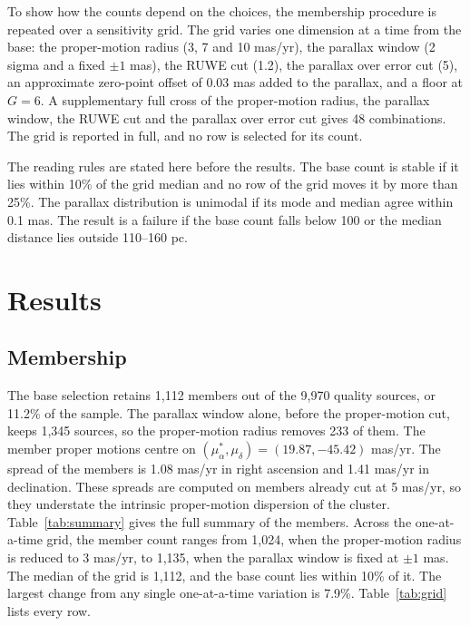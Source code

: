 \documentclass[11pt]{article}
\begin{document}
To show how the counts depend on the choices, the membership procedure is repeated over a sensitivity grid. The grid varies one dimension at a time from the base: the proper-motion radius (3, 7 and 10 mas/yr), the parallax window (2 sigma and a fixed $\pm 1$ mas), the RUWE cut (1.2), the parallax over error cut (5), an approximate zero-point offset of 0.03 mas added to the parallax, and a floor at $G = 6$. A supplementary full cross of the proper-motion radius, the parallax window, the RUWE cut and the parallax over error cut gives 48 combinations.
The grid is reported in full, and no row is selected for its count.

The reading rules are stated here before the results. The base count is stable if it lies within 10\% of the grid median and no row of the grid moves it by more than 25\%. The parallax distribution is unimodal if its mode and median agree within 0.1 mas. The result is a failure if the base count falls below 100 or the median distance lies outside 110--160 pc.

\section{Results}

\subsection{Membership}

The base selection retains 1,112 members out of the 9,970 quality sources, or 11.2\% of the sample.
The parallax window alone, before the proper-motion cut, keeps 1,345 sources, so the proper-motion radius removes 233 of them.
The member proper motions centre on $(\mu_\alpha^*, \mu_\delta) = (19.87, -45.42)$ mas/yr.
The spread of the members is 1.08 mas/yr in right ascension and 1.41 mas/yr in declination. These spreads are computed on members already cut at 5 mas/yr, so they understate the intrinsic proper-motion dispersion of the cluster.
Table~\ref{tab:summary} gives the full summary of the members. Across the one-at-a-time grid, the member count ranges from 1,024, when the proper-motion radius is reduced to 3 mas/yr, to 1,135, when the parallax window is fixed at $\pm 1$ mas.
The median of the grid is 1,112, and the base count lies within 10\% of it. The largest change from any single one-at-a-time variation is 7.9\%.
Table~\ref{tab:grid} lists every row.
\end{document}
